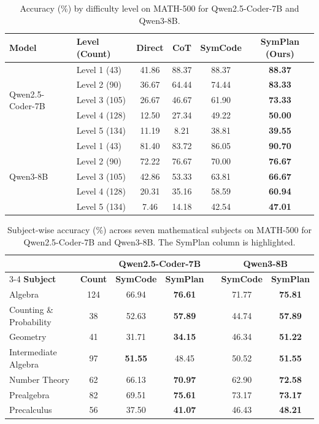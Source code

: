 \documentclass[runningheads]{llncs}
\begin{document}
\begin{table}[t]
\centering
\caption{Accuracy (\%) by difficulty level on MATH-500 for Qwen2.5-Coder-7B and Qwen3-8B.}
\label{tab:levels}
\setlength{\tabcolsep}{4.5pt}
\small
\begin{tabular}{llcccc}
\toprule
\rowcolor{headergray}
\textbf{Model} & \textbf{Level (Count)} & \textbf{Direct} & \textbf{CoT} & \textbf{SymCode} & \textbf{SymPlan (Ours)} \\
\midrule
\multirow{5}{*}{Qwen2.5-Coder-7B} 
& Level 1 (43) & 41.86 & 88.37 & 88.37 & \textbf{88.37} \\
& Level 2 (90) & 36.67 & 64.44 & 74.44 & \textbf{83.33} \\
& Level 3 (105) & 26.67 & 46.67 & 61.90 & \textbf{73.33} \\
& Level 4 (128) & 12.50 & 27.34 & 49.22 & \textbf{50.00} \\
& Level 5 (134) & 11.19 & 8.21 & 38.81 & \textbf{39.55} \\
\midrule
\multirow{5}{*}{Qwen3-8B} 
& Level 1 (43) & 81.40 & 83.72 & 86.05 & \textbf{90.70} \\
& Level 2 (90) & 72.22 & 76.67 & 70.00 & \textbf{76.67} \\
& Level 3 (105) & 42.86 & 53.33 & 63.81 & \textbf{66.67} \\
& Level 4 (128) & 20.31 & 35.16 & 58.59 & \textbf{60.94} \\
& Level 5 (134) & 7.46 & 14.18 & 42.54 & \textbf{47.01} \\
\bottomrule
\end{tabular}
\end{table}

\begin{table}[t]
\centering
\caption{Subject-wise accuracy (\%) across seven mathematical subjects on MATH-500 for Qwen2.5-Coder-7B and Qwen3-8B. The SymPlan column is highlighted.}
\label{tab:subjects}
\setlength{\tabcolsep}{3.5pt}
\footnotesize
\begin{tabular}{lcccccc}
\toprule
\rowcolor{headergray}
& & \multicolumn{2}{c}{\textbf{Qwen2.5-Coder-7B}} & & \multicolumn{2}{c}{\textbf{Qwen3-8B}} \\
\cmidrule{3-4} \cmidrule{6-7}
\rowcolor{headergray}
\textbf{Subject} & \textbf{Count} & \textbf{SymCode} & \textbf{SymPlan} & & \textbf{SymCode} & \textbf{SymPlan} \\
\midrule
Algebra & 124 & 66.94 & \textbf{76.61} & & 71.77 & \textbf{75.81} \\
Counting \& Probability & 38 & 52.63 & \textbf{57.89} & & 44.74 & \textbf{57.89} \\
Geometry & 41 & 31.71 & \textbf{34.15} & & 46.34 & \textbf{51.22} \\
Intermediate Algebra & 97 & \textbf{51.55} & 48.45 & & 50.52 & \textbf{51.55} \\
Number Theory & 62 & 66.13 & \textbf{70.97} & & 62.90 & \textbf{72.58} \\
Prealgebra & 82 & 69.51 & \textbf{75.61} & & 73.17 & \textbf{73.17} \\
Precalculus & 56 & 37.50 & \textbf{41.07} & & 46.43 & \textbf{48.21} \\
\bottomrule
\end{tabular}
\end{table}
\end{document}
